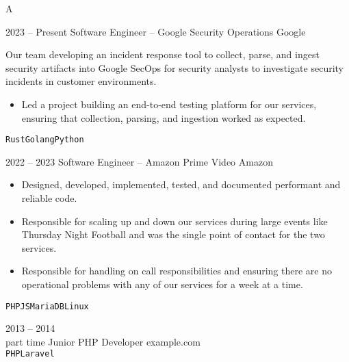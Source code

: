 \documentclass[9pt]{developercv} %
\begin{document}
\vspace{0.5cm} %



A


\begin{entrylist}
  \entry
  {2023 -- Present}
  {Software Engineer -- Google Security Operations}
  {Google}
  {

    Our team developing an incident response tool to collect,
    parse, and ingest security artifacts into Google SecOps for security
    analysts to investigate security incidents in customer environments.

    \begin{itemize}[leftmargin=\parindent, leftmargin=*]

      \item
        Led a project building an end-to-end testing platform for our services,
        ensuring that collection, parsing, and ingestion worked as
        expected.
    \end{itemize}

  \texttt{Rust}\slashsep\texttt{Golang}\slashsep\texttt{Python}}
  \entry
  {2022 -- 2023}
  {Software Engineer -- Amazon Prime Video}
  {Amazon}
  {
    \begin{itemize}[leftmargin=\parindent, leftmargin=*]
      \item Designed, developed, implemented, tested, and documented
        performant and reliable code.
      \item Responsible for scaling up and down our services during
        large events like Thursday Night Football and was the single
        point of contact for the two services.
      \item Responsible for handling on call responsibilities and
        ensuring there are no operational problems with any of our
        services for a week at a time.
    \end{itemize}

  \texttt{PHP}\slashsep\texttt{JS}\slashsep\texttt{MariaDB}\slashsep\texttt{Linux}}
  \entry
  {2013 -- 2014\\\footnotesize{part time}}
  {Junior PHP Developer}
  {example.com}
  {\lorem\lorem\\ \texttt{PHP}\slashsep\texttt{Laravel}}
\end{entrylist}
\end{document}
